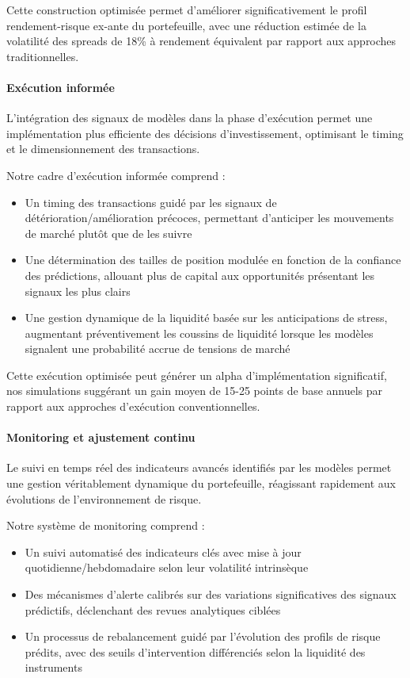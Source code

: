 Cette construction optimisée permet d'améliorer significativement le profil rendement-risque ex-ante du portefeuille, avec une réduction estimée de la volatilité des spreads de 18\% à rendement équivalent par rapport aux approches traditionnelles.

\paragraph{Exécution informée}

L'intégration des signaux de modèles dans la phase d'exécution permet une implémentation plus efficiente des décisions d'investissement, optimisant le timing et le dimensionnement des transactions.

Notre cadre d'exécution informée comprend :
\begin{itemize}
    \item Un timing des transactions guidé par les signaux de détérioration/amélioration précoces, permettant d'anticiper les mouvements de marché plutôt que de les suivre
    \item Une détermination des tailles de position modulée en fonction de la confiance des prédictions, allouant plus de capital aux opportunités présentant les signaux les plus clairs
    \item Une gestion dynamique de la liquidité basée sur les anticipations de stress, augmentant préventivement les coussins de liquidité lorsque les modèles signalent une probabilité accrue de tensions de marché
\end{itemize}

Cette exécution optimisée peut générer un alpha d'implémentation significatif, nos simulations suggérant un gain moyen de 15-25 points de base annuels par rapport aux approches d'exécution conventionnelles.

\paragraph{Monitoring et ajustement continu}

Le suivi en temps réel des indicateurs avancés identifiés par les modèles permet une gestion véritablement dynamique du portefeuille, réagissant rapidement aux évolutions de l'environnement de risque.

Notre système de monitoring comprend :
\begin{itemize}
    \item Un suivi automatisé des indicateurs clés avec mise à jour quotidienne/hebdomadaire selon leur volatilité intrinsèque
    \item Des mécanismes d'alerte calibrés sur des variations significatives des signaux prédictifs, déclenchant des revues analytiques ciblées
    \item Un processus de rebalancement guidé par l'évolution des profils de risque prédits, avec des seuils d'intervention différenciés selon la liquidité des instruments
\end{itemize}


